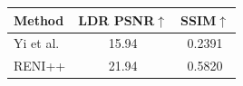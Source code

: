 \begin{tabular}{l|cc}
\hline
Method & LDR PSNR$\uparrow$ & SSIM$\uparrow$ \\
\hline
Yi et al. & 15.94 & 0.2391 \\
RENI++ & 21.94 & 0.5820 \\
\hline
\end{tabular}